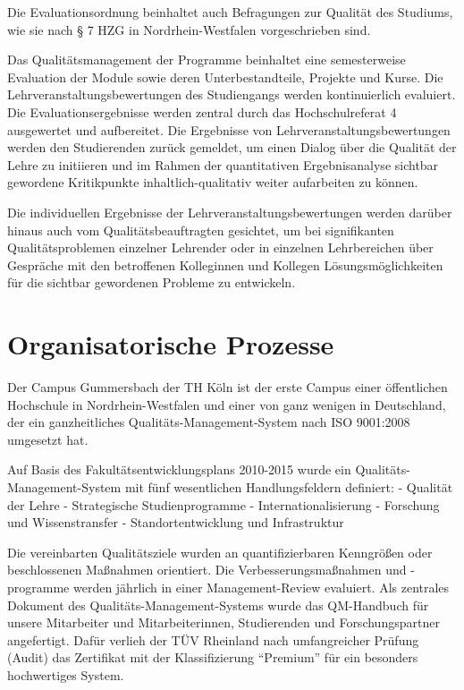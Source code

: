 Die Evaluationsordnung beinhaltet auch Befragungen zur Qualität des
Studiums, wie sie nach § 7 HZG in Nordrhein-Westfalen vorgeschrieben
sind.

Das Qualitätsmanagement der Programme beinhaltet eine semesterweise
Evaluation der Module sowie deren Unterbestandteile, Projekte und Kurse.
Die Lehrveranstaltungsbewertungen des Studiengangs werden kontinuierlich
evaluiert. Die Evaluationsergebnisse werden zentral durch das
Hochschulreferat 4 ausgewertet und aufbereitet. Die Ergebnisse von
Lehrveranstaltungsbewertungen werden den Studierenden zurück gemeldet,
um einen Dialog über die Qualität der Lehre zu initiieren und im Rahmen
der quantitativen Ergebnisanalyse sichtbar gewordene Kritikpunkte
inhaltlich-qualitativ weiter aufarbeiten zu können.

Die individuellen Ergebnisse der Lehrveranstaltungsbewertungen werden
darüber hinaus auch vom Qualitätsbeauftragten gesichtet, um bei
signifikanten Qualitätsproblemen einzelner Lehrender oder in einzelnen
Lehrbereichen über Gespräche mit den betroffenen Kolleginnen und
Kollegen Lösungsmöglichkeiten für die sichtbar gewordenen Probleme zu
entwickeln.

\section{Organisatorische Prozesse}\label{organisatorische-prozesse}

Der Campus Gummersbach der TH Köln ist der erste Campus einer
öffentlichen Hochschule in Nordrhein-Westfalen und einer von ganz
wenigen in Deutschland, der ein ganzheitliches
Qualitäts-Management-System nach ISO 9001:2008 umgesetzt hat.

Auf Basis des Fakultätsentwicklungsplans 2010-2015 wurde ein
Qualitäts-Management-System mit fünf wesentlichen Handlungsfeldern
definiert: - Qualität der Lehre - Strategische Studienprogramme -
Internationalisierung - Forschung und Wissenstransfer -
Standortentwicklung und Infrastruktur

Die vereinbarten Qualitätsziele wurden an quantifizierbaren Kenngrößen
oder beschlossenen Maßnahmen orientiert. Die Verbesserungsmaßnahmen und
-programme werden jährlich in einer Management-Review evaluiert. Als
zentrales Dokument des Qualitäts-Management-Systems wurde das
QM-Handbuch für unsere Mitarbeiter und Mitarbeiterinnen, Studierenden
und Forschungspartner angefertigt. Dafür verlieh der TÜV Rheinland nach
umfangreicher Prüfung (Audit) das Zertifikat mit der Klassifizierung
``Premium'' für ein besonders hochwertiges System.

